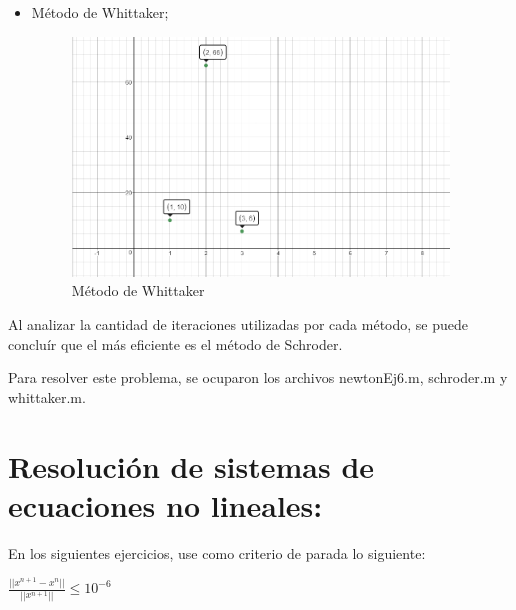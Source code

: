 \documentclass{udpreport}
\begin{document}
\begin{enumerate}
\begin{enumerate}
\begin{itemize}
				 
				 \item Método de Whittaker;
				 \begin{figure}[H]
					\centering
						\includegraphics[width=10cm]{WhittakerEj6}
						\caption{Método de Whittaker}
				\end{figure}	
			\end{itemize}
			
			Al analizar la cantidad de iteraciones utilizadas por cada método, se puede concluír que el más eficiente es el método de Schroder.
			
			Para resolver este problema, se ocuparon los archivos newtonEj6.m, schroder.m y whittaker.m.
        \end{enumerate}
\end{enumerate}
\newpage
\chapter{Resolución de sistemas de ecuaciones no lineales:}
    
        
        En los siguientes ejercicios, use como criterio de parada lo siguiente:
        \begin{center}
            $ \frac{|| x^{n+1} - x^{n} ||}{|| x^{n+1} ||} \leq 10^{-6} $  
        \end{center}
        
\end{document}
